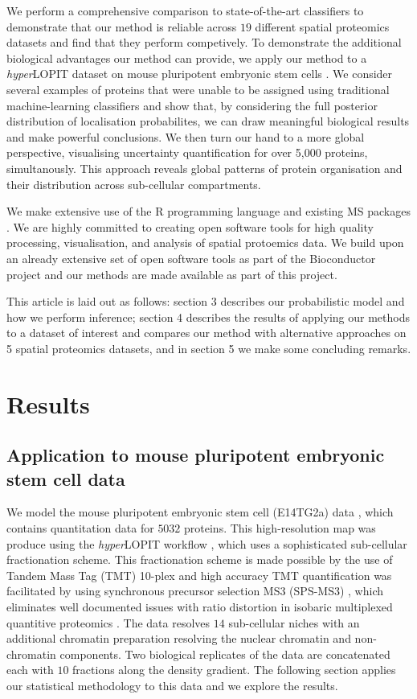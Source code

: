 \documentclass[12pt,english]{article}
\begin{document}
We perform a comprehensive comparison to state-of-the-art classifiers to demonstrate that our method is reliable across $19$ different spatial proteomics datasets and find that they perform competively. To demonstrate
the additional biological advantages our method can provide, we apply our method to a \textit{hyper}LOPIT
dataset on mouse pluripotent embryonic stem cells \citep{hyper}. We consider several examples of proteins
that were unable to be assigned using traditional machine-learning classifiers and show that, by considering
the full posterior distribution of localisation probabilites, we can draw meaningful biological results and
make powerful conclusions. We then turn our hand to a more global perspective, visualising uncertainty quantification for over 5,000 proteins, simultanously. This approach reveals global patterns of protein organisation and their distribution across sub-cellular compartments.

We make extensive use of the R programming language \citep{R}
and existing MS packages \citep{MSnbase:2012, pRoloc:2014}. We are highly committed to creating
open software tools for high quality processing, visualisation, and analysis of spatial protoemics data.
We build upon an already extensive set of open software tools \citep{pRoloc:2014} as part of the Bioconductor
project \citep{Bioconductor::2004, Huber::2015} and our methods are made available as part of this project.

This article is laid out as follows: section 3 describes our probabilistic model and
how we perform inference; section 4 describes the results of applying our methods to a dataset of interest
and compares our method with alternative approaches on 5 spatial proteomics datasets, and in section 5 we make some
concluding remarks.

\section{Results}

\subsection{Application to mouse pluripotent embryonic stem cell data}

We model the mouse pluripotent embryonic stem cell (E14TG2a) data  \citep{hyper}, which
contains quantitation data for $5032$ proteins. This high-resolution map was
produce using the \textit{hyper}LOPIT workflow \citep{Mulvey:2017}, which uses a sophisticated
sub-cellular fractionation scheme. This fractionation scheme is made possible
by the use of Tandem Mass Tag (TMT) 10-plex and high accuracy TMT quantification
was facilitated by using synchronous precursor selection MS3 (SPS-MS3) \citep{Mcalister::2014},
which eliminates well documented issues with ratio distortion in isobaric multiplexed quantitive proteomics
\citep{Ting:2011}. The data resolves
$14$ sub-cellular niches with an additional chromatin preparation
resolving the nuclear chromatin and non-chromatin components. Two
biological replicates of the data are concatenated each with $10$ fractions
along the density gradient. The following section applies our statistical
methodology to this data and we explore the results.
\end{document}
